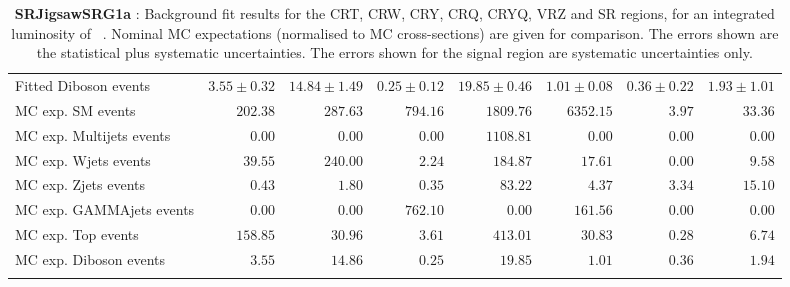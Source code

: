 \begin{table}
\begin{center}
{\begin{tabular*}{\textwidth}{@{\extracolsep{\fill}}lrrrrrrr}
        Fitted Diboson events         & $3.55 \pm 0.32$          & $14.84 \pm 1.49$          & $0.25 \pm 0.12$          & $19.85 \pm 0.46$          & $1.01 \pm 0.08$          & $0.36 \pm 0.22$          & $1.93 \pm 1.01$              \\
 \noalign{\smallskip}\hline\noalign{\smallskip}
MC exp. SM events              & $202.38$          & $287.63$          & $794.16$          & $1809.76$          & $6352.15$          & $3.97$          & $33.36$              \\
\noalign{\smallskip}\hline\noalign{\smallskip}
        MC exp. Multijets events         & $0.00$          & $0.00$          & $0.00$          & $1108.81$          & $0.00$          & $0.00$          & $0.00$              \\
        MC exp. Wjets events         & $39.55$          & $240.00$          & $2.24$          & $184.87$          & $17.61$          & $0.00$          & $9.58$              \\
        MC exp. Zjets events         & $0.43$          & $1.80$          & $0.35$          & $83.22$          & $4.37$          & $3.34$          & $15.10$              \\
        MC exp. GAMMAjets events         & $0.00$          & $0.00$          & $762.10$          & $0.00$          & $161.56$          & $0.00$          & $0.00$              \\
        MC exp. Top events         & $158.85$          & $30.96$          & $3.61$          & $413.01$          & $30.83$          & $0.28$          & $6.74$              \\
        MC exp. Diboson events         & $3.55$          & $14.86$          & $0.25$          & $19.85$          & $1.01$          & $0.36$          & $1.94$              \\
\noalign{\smallskip}\hline\noalign{\smallskip}
\end{tabular*}
}
\end{center}
\caption{{\bf SRJigsawSRG1a} : Background fit results for the CRT, CRW, CRY, CRQ, CRYQ, VRZ and SR regions, for an integrated luminosity of \ourintlumi~\ifb. Nominal MC expectations (normalised to MC cross-sections) are given for comparison. The errors shown are the statistical plus systematic uncertainties. The errors shown for the signal region are systematic uncertainties only.}
\label{table.results.systematics.in.logL.fit.CRT.CRW.CRY.CRQ.CRYQ.VRZ.SR.SRJigsawSRG1a}
\end{table}
%